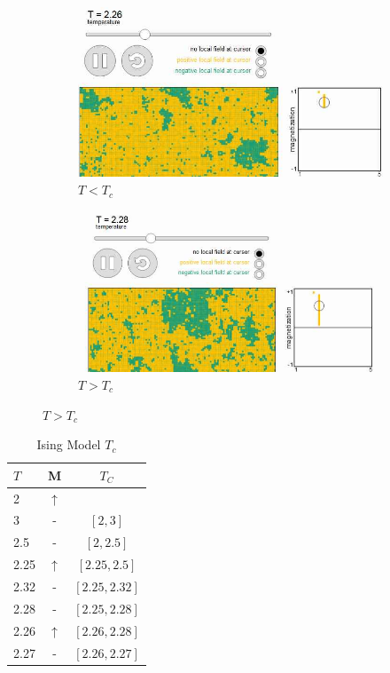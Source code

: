 \documentclass[]{article}
\begin{document}
\begin{figure}[H]
	\caption{Ising Model Interactive}
	\begin{subfigure}[t]{0.45\textwidth}
		\caption{$T<T_c$}\label{fig:tLtTc}
		\includegraphics[width=\textwidth]{tLtTc}
	\end{subfigure}
	\;\;\;\;
	\begin{subfigure}[t]{0.45\textwidth}
		\caption{$T>T_c$}\label{fig:tGtTc}
		\includegraphics[width=\textwidth]{tGtTc}
	\end{subfigure}
\end{figure}

\begin{table}[H]
	\begin{center}
		\caption{Ising Model $T_c$}\label{eq:ising}
		\begin{tabular}{|l|c|c|}\hline
			$T$&M&$T_C$\\ \hline
			2&$\uparrow$&\\ \hline
			3&-&$[2,3]$\\ \hline
			2.5&-&$[2,2.5]$\\ \hline
			2.25&$\uparrow$&$[2.25,2.5]$\\ \hline
			2.32&-&$[2.25,2.32]$\\ \hline
			2.28&-&$[2.25,2.28]$\\ \hline
			2.26&$\uparrow$&$[2.26,2.28]$\\ \hline
			2.27&-&$[2.26,2.27]$\\ \hline
		\end{tabular}
	\end{center}
\end{table}
\end{document}
